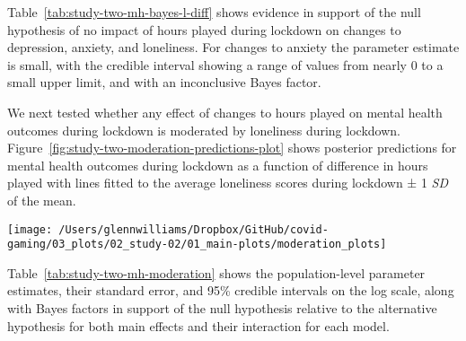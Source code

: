 \documentclass[
  english,
  man,floatsintext]{apa6}
\begin{document}
Table~\ref{tab:study-two-mh-bayes-l-diff} shows evidence in support of the null hypothesis of no impact of hours played during lockdown on changes to depression, anxiety, and loneliness. For changes to anxiety the parameter estimate is small, with the credible interval showing a range of values from nearly 0 to a small upper limit, and with an inconclusive Bayes factor.

We next tested whether any effect of changes to hours played on mental health outcomes during lockdown is moderated by loneliness during lockdown. Figure~\ref{fig:study-two-moderation-predictions-plot} shows posterior predictions for mental health outcomes during lockdown as a function of difference in hours played with lines fitted to the average loneliness scores during lockdown ± 1 \emph{SD} of the mean.

\begin{figure*}[!htbp]

{\centering \texttt{[image: /Users/glennwilliams/Dropbox/GitHub/covid-gaming/03\_plots/02\_study-02/01\_main-plots/moderation\_plots]} 

}

\caption{Mental health outcomes for the depression, anxiety, and stress measures as a function of the difference in hours played before and during lockdown and loneliness scores during lockdown. Lines and ribbons indicate the posterior mean ± 95\% credible intervals, with each line representing the mean loneliness score ± 1 SD.}\label{fig:study-two-moderation-predictions-plot}
\end{figure*}

Table~\ref{tab:study-two-mh-moderation} shows the population-level parameter estimates, their standard error, and 95\% credible intervals on the log scale, along with Bayes factors in support of the null hypothesis relative to the alternative hypothesis for both main effects and their interaction for each model.
\end{document}
